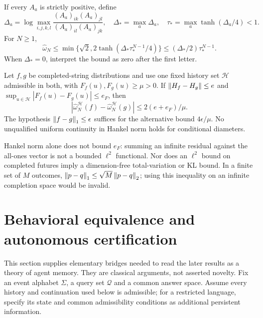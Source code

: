 \begin{theorem}
If every $A_a$ is strictly positive, define
\[
 \Delta_a=\log\max_{i,j,k,l}\frac{(A_a)_{ik}(A_a)_{jl}}{(A_a)_{il}(A_a)_{jk}},\quad
 \Delta_* =\max_a\Delta_a,\quad\tau_* =\max_a\tanh(\Delta_a/4)<1.
\]
For $N\ge1$,
\[
 \widehat\omega_N\le
 \min\{\sqrt2,2\tanh(\Delta_*\tau_*^{N-1}/4)\}
 \le(\Delta_*/2)\tau_*^{N-1}.
\]
When $\Delta_*=0$, interpret the bound as zero after the first letter.
\end{theorem}


\begin{theorem}\label{III:S:thm:conditionaltransfer}
Let $f,g$ be completed-string distributions and use one fixed history set $\mathcal H$ admissible in both, with $F_f(u),F_g(u)\ge\mu>0$. If $\left\lVert H_f-H_g\right\rVert\le e$ and $\sup_{u\in\mathcal H}|F_f(u)-F_g(u)|\le e_F$, then
\[
 |\widehat\omega_N^{\mathcal H}(f)-\widehat\omega_N^{\mathcal H}(g)|
 \le2(e+e_F)/\mu.
\]
The hypothesis $\left\lVert f-g\right\rVert_1\le\epsilon$ suffices for the alternative bound $4\epsilon/\mu$. No unqualified uniform continuity in Hankel norm holds for conditional diameters.
\end{theorem}

Hankel norm alone does not bound $e_F$: summing an infinite residual against the all-ones vector is not a bounded $\ell^2$ functional. Nor does an $\ell^2$ bound on completed futures imply a dimension-free total-variation or KL bound. In a finite set of $M$ outcomes, $\left\lVert p-q\right\rVert_1\le\sqrt M\left\lVert p-q\right\rVert_2$; using this inequality on an infinite completion space would be invalid.

\section{Behavioral equivalence and autonomous certification}
\label{III:M:sec:behavioral-contract}
This section supplies elementary bridges needed to read the later results
as a theory of agent memory. They are classical arguments, not asserted
novelty. Fix an event alphabet $\Sigma$, a query set $\mathcal Q$ and a
common answer space. Assume every history and continuation used below is
admissible; for a restricted language, specify its state and common
admissibility conditions as additional persistent information.

